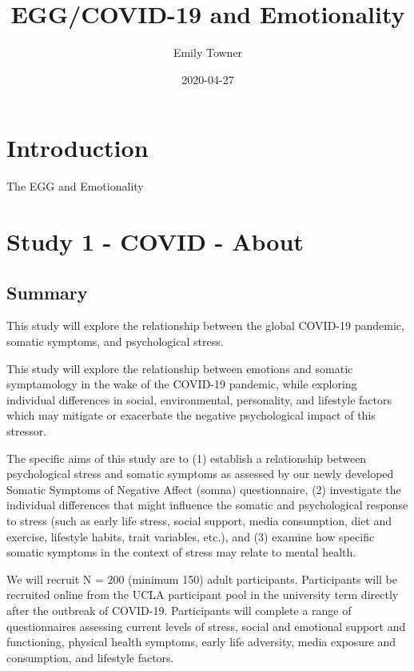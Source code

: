 \documentclass[]{book}
\title{EGG/COVID-19 and Emotionality}
\author{Emily Towner}
\date{2020-04-27}
\begin{document}
\maketitle

{
\setcounter{tocdepth}{1}
\tableofcontents
}
\hypertarget{introduction}{%
\chapter{Introduction}\label{introduction}}

The EGG and Emotionality

\hypertarget{study-1---covid---about}{%
\chapter{Study 1 - COVID - About}\label{study-1---covid---about}}

\hypertarget{summary}{%
\section{Summary}\label{summary}}

This study will explore the relationship between the global COVID-19 pandemic, somatic symptoms, and psychological stress.

This study will explore the relationship between emotions and somatic symptamology in the wake of the COVID-19 pandemic, while exploring individual differences in social, environmental, personality, and lifestyle factors which may mitigate or exacerbate the negative psychological impact of this stressor.

The specific aims of this study are to (1) establish a relationship between psychological stress and somatic symptoms as assessed by our newly developed Somatic Symptoms of Negative Affect (somna) questionnaire, (2) investigate the individual differences that might influence the somatic and psychological response to stress (such as early life stress, social support, media consumption, diet and exercise, lifestyle habits, trait variables, etc.), and (3) examine how specific somatic symptoms in the context of stress may relate to mental health.

We will recruit N = 200 (minimum 150) adult participants. Participants will be recruited online from the UCLA participant pool in the university term directly after the outbreak of COVID-19. Participants will complete a range of questionnaires assessing current levels of stress, social and emotional support and functioning, physical health symptoms, early life adversity, media exposure and consumption, and lifestyle factors.
\end{document}
